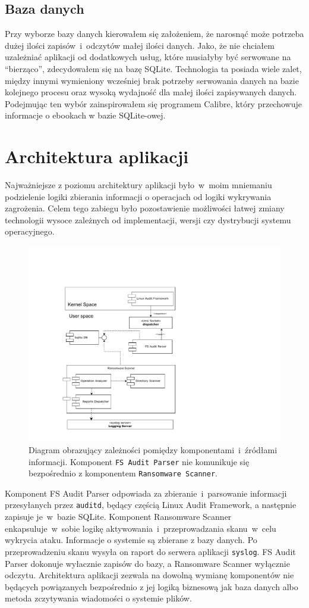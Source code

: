 \subsection{Baza danych}
Przy wyborze bazy danych kierowałem się założeniem, że narosnąć może potrzeba dużej ilości zapisów~i~odczytów małej ilości danych. Jako, że nie chciałem uzależniać aplikacji od dodatkowych usług, które musiałyby być serwowane na \enquote{bierząco}, zdecydowałem się na bazę SQLite. 
\newline
Technologia ta posiada wiele zalet, między innymi wymieniony wcześniej brak potrzeby serwowania danych na bazie kolejnego procesu oraz wysoką wydajność dla małej ilości zapisywanych danych. Podejmując ten wybór zainspirowałem się programem Calibre, który przechowuje informacje o ebookach w bazie SQLite-owej.


\section{Architektura aplikacji}
Najważniejsze z poziomu architektury aplikacji było~w~moim mniemaniu podzielenie logiki zbierania informacji o operacjach od logiki wykrywania zagrożenia. Celem tego zabiegu było pozostawienie możliwości łatwej zmiany technologii wysoce zależnych od implementacji, wersji czy dystrybucji systemu operacyjnego.
\begin{figure}[H]
    \centering
    \includegraphics[width=0.52\linewidth]{rysunki/architektura-systemu.drawio.pdf}
    \caption{Diagram obrazujący zależności pomiędzy komponentami~i~źródłami informacji. Komponent \texttt{FS Audit Parser} nie komunikuje się bezpośrednio z komponentem \texttt{Ransomware Scanner}.}
    \label{fig:enter-label}
\end{figure}
Komponent FS Audit Parser odpowiada za zbieranie~i~parsowanie informacji przesyłanych przez \texttt{auditd}, będący częścią Linux Audit Framework, a następnie zapisuje je~w~bazie SQLite.
\newline
Komponent Ransomware Scanner enkapsuluje~w~sobie logikę aktywowania~i~przeprowadzania skanu~w~celu wykrycia ataku. Informacje o systemie są zbierane z bazy danych. Po przeprowadzeniu skanu wysyła on raport do serwera aplikacji \texttt{syslog}.
\newline
FS Audit Parser dokonuje wyłacznie zapisów do bazy, a Ransomware Scanner wyłącznie odczytu. Architektura aplikacji zezwala na dowolną wymianę komponentów nie będących powiązanych bezpośrednio z jej logiką biznesową jak baza danych albo metoda zczytywania wiadomości o systemie plików.

